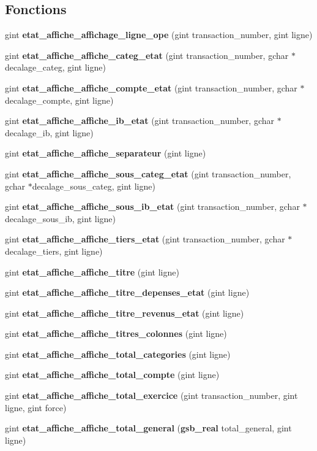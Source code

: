 \subsection*{Fonctions}
\begin{DoxyCompactItemize}
\item 
gint {\bf etat\_\-affiche\_\-affichage\_\-ligne\_\-ope} (gint transaction\_\-number, gint ligne)
\item 
gint {\bf etat\_\-affiche\_\-affiche\_\-categ\_\-etat} (gint transaction\_\-number, gchar $\ast$decalage\_\-categ, gint ligne)
\item 
gint {\bf etat\_\-affiche\_\-affiche\_\-compte\_\-etat} (gint transaction\_\-number, gchar $\ast$decalage\_\-compte, gint ligne)
\item 
gint {\bf etat\_\-affiche\_\-affiche\_\-ib\_\-etat} (gint transaction\_\-number, gchar $\ast$decalage\_\-ib, gint ligne)
\item 
gint {\bf etat\_\-affiche\_\-affiche\_\-separateur} (gint ligne)
\item 
gint {\bf etat\_\-affiche\_\-affiche\_\-sous\_\-categ\_\-etat} (gint transaction\_\-number, gchar $\ast$decalage\_\-sous\_\-categ, gint ligne)
\item 
gint {\bf etat\_\-affiche\_\-affiche\_\-sous\_\-ib\_\-etat} (gint transaction\_\-number, gchar $\ast$decalage\_\-sous\_\-ib, gint ligne)
\item 
gint {\bf etat\_\-affiche\_\-affiche\_\-tiers\_\-etat} (gint transaction\_\-number, gchar $\ast$decalage\_\-tiers, gint ligne)
\item 
gint {\bf etat\_\-affiche\_\-affiche\_\-titre} (gint ligne)
\item 
gint {\bf etat\_\-affiche\_\-affiche\_\-titre\_\-depenses\_\-etat} (gint ligne)
\item 
gint {\bf etat\_\-affiche\_\-affiche\_\-titre\_\-revenus\_\-etat} (gint ligne)
\item 
gint {\bf etat\_\-affiche\_\-affiche\_\-titres\_\-colonnes} (gint ligne)
\item 
gint {\bf etat\_\-affiche\_\-affiche\_\-total\_\-categories} (gint ligne)
\item 
gint {\bf etat\_\-affiche\_\-affiche\_\-total\_\-compte} (gint ligne)
\item 
gint {\bf etat\_\-affiche\_\-affiche\_\-total\_\-exercice} (gint transaction\_\-number, gint ligne, gint force)
\item 
gint {\bf etat\_\-affiche\_\-affiche\_\-total\_\-general} ({\bf gsb\_\-real} total\_\-general, gint ligne)

\end{DoxyCompactItemize}
